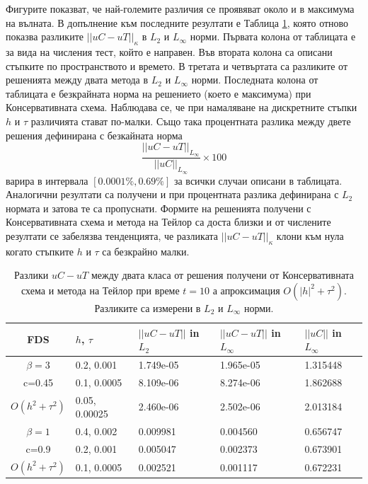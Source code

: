 \documentclass{article}
\begin{document}
Фигурите показват, че най-големите различия се проявяват около и в максимума на вълната. В допълнение към последните резултати е Таблица \ref{tableF}, която отново показва разликите $||uC - uT||_\kappa$ в  $L_2$ и ${L_\infty}$ норми. Първата колона от таблицата е за вида на числения тест, който е направен. Във втората колона са описани стъпките по пространството и времето. В третата и четвъртата са разликите от решенията между двата метода в $L_2$ и ${L_\infty}$ норми. Последната колона от таблицата е безкрайната норма на решението (което е максимума) при Консервативната схема. Наблюдава се, че при намаляване на дискретните стъпки $h$ и $\tau$ различията стават по-малки. Също така процентната разлика между двете решения дефинирана с безкайната норма
$$\frac{ ||uC - uT||_{L_\infty}} { ||uC||_{L_\infty} } \times 100$$
варира в интервала $[0.0001\%, 0.69\%]$ за всички случаи описани в таблицата. Аналогични резултати са получени и при процентната разлика дефинирана с $L_2$ нормата и затова те са пропуснати. Формите на решенията получени с Консервативната схема и метода на Тейлор са доста близки и от числените резултати се забелязва тенденцията, че разликата $||uC - uT||_\kappa$ клони към нула когато стъпките $h$ и $\tau$ са безкрайно малки.

\begin{table}[ht]
\centering
\small
		\begin{tabular}{||c|l|l|l|l||}
			\hline
			\hline
      FDS        &$h$, $\tau$  &   $||uC - uT||$  in $L_2$     &  $||uC - uT||$ in $L_\infty$ & $||uC||$ in $L_\infty$ \\
   			\hline 
					\hline 
  $\beta=3$                   &0.2, 0.001         &  1.749e-05      &  1.965e-05  & 1.315448     \\
   c=0.45                        &0.1, 0.0005        &  8.109e-06       & 8.274e-06 &  1.862688     \\
     $O(h^2 + \tau^ 2)$ &0.05, 0.00025     & 2.460e-06         &2.502e-06  &   2.013184   \\
			\hline 
			\hline 
       $\beta=1$          &0.4, 0.002        & 0.009981     & 0.004560 & 0.656747   \\
                  c=0.9      &0.2, 0.001        & 0.005047      & 0.002373  & 0.673901   \\
  $O(h^2+ \tau^2)$ &0.1, 0.0005         & 0.002521      &0.001117 & 0.672231   \\
			\hline
	   \hline
			\hline 
		\end{tabular}
		\caption{Разлики $uC - uT$ между двата класа от решения получени от Консервативната схема и метода на Тейлор при време $t=10$ а апроксимация $O(|h|^2 + \tau^2)$. Разликите са измерени в $L_2$ и $L_\infty$ норми.}
\label{tableF}
\end{table}
\end{document}
